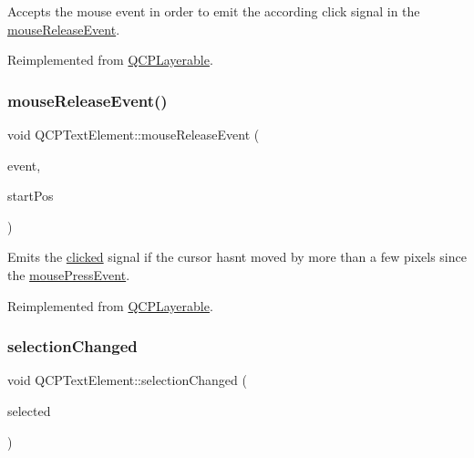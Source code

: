 Accepts the mouse event in order to emit the according click signal in the \mbox{\hyperlink{class_q_c_p_text_element_acfcbaf9b1da18745e72726aafb39c855}{mouse\+Release\+Event}}.

Reimplemented from \mbox{\hyperlink{class_q_c_p_layerable_af6567604818db90f4fd52822f8bc8376}{Q\+C\+P\+Layerable}}.

\mbox{\label{class_q_c_p_text_element_acfcbaf9b1da18745e72726aafb39c855}} 
\subsubsection{\texorpdfstring{mouse\+Release\+Event()}{mouseReleaseEvent()}}
{\footnotesize\ttfamily void Q\+C\+P\+Text\+Element\+::mouse\+Release\+Event (\begin{DoxyParamCaption}\item[{Q\+Mouse\+Event $\ast$}]{event,  }\item[{const Q\+PointF \&}]{start\+Pos }\end{DoxyParamCaption})\hspace{0.3cm}{\ttfamily [virtual]}}

Emits the \mbox{\hyperlink{class_q_c_p_text_element_ad2246a0e701c0655623f048737298334}{clicked}} signal if the cursor hasn\textquotesingle{}t moved by more than a few pixels since the \mbox{\hyperlink{class_q_c_p_text_element_ad7b2c98355e3d2f912574b74fcee0574}{mouse\+Press\+Event}}.

Reimplemented from \mbox{\hyperlink{class_q_c_p_layerable_aa0d79b005686f668622bbe66ac03ba2c}{Q\+C\+P\+Layerable}}.

\mbox{\label{class_q_c_p_text_element_a49f45b87ee9c1fe866c2cdd12af17a9a}} 
\subsubsection{\texorpdfstring{selection\+Changed}{selectionChanged}}
{\footnotesize\ttfamily void Q\+C\+P\+Text\+Element\+::selection\+Changed (\begin{DoxyParamCaption}\item[{bool}]{selected }\end{DoxyParamCaption})\hspace{0.3cm}{\ttfamily [signal]}}

